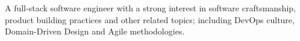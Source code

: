 A full-stack software engineer with a strong interest in software craftsmanship, product building practices and other related topics; including DevOps culture, Domain-Driven Design and Agile methodologies.
